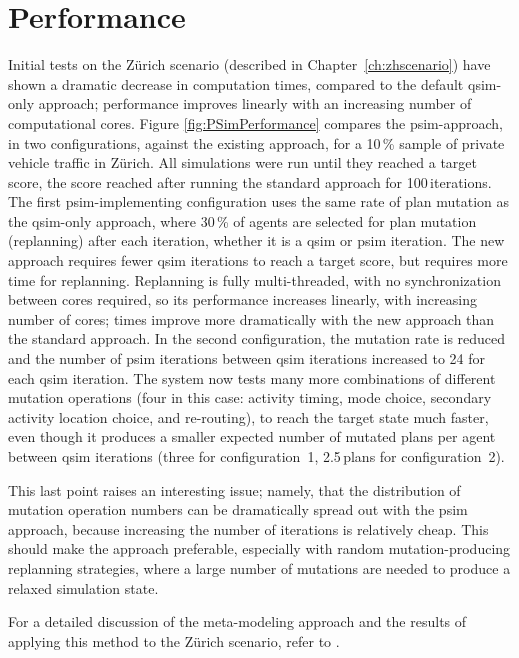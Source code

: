 \section{Performance}
Initial tests on the Zürich scenario (described in Chapter~\ref{ch:zhscenario}) have shown a dramatic decrease in computation times, compared to the default \gls{qsim}-only approach; performance improves linearly with an increasing number of computational cores.
Figure \ref{fig:PSimPerformance} compares the \gls{psim}-approach, in two configurations, against the existing approach, for a 10\,\% sample of private vehicle traffic in Zürich. All simulations were run until they reached a target score, \ie the score reached after running the standard approach for 100\,iterations. The first \gls{psim}-implementing configuration uses the same rate of plan mutation as the \gls{qsim}-only approach, where 30\,\% of agents are selected for plan mutation (replanning) after each iteration, whether it is a \gls{qsim} or \gls{psim} iteration. The new approach requires fewer \gls{qsim} iterations to reach a target score, but requires more time for replanning. Replanning is fully multi-threaded, with no synchronization between cores required, so its performance increases linearly, with increasing number of cores; times improve more dramatically with the new approach than the standard approach.
In the second configuration, the mutation rate is reduced and the number of \gls{psim} iterations between \gls{qsim} iterations increased to 24 for each \gls{qsim} iteration. The system now tests many more combinations of different mutation operations (four in this case: activity timing, mode choice, secondary activity location choice, and re-routing), to reach the target state much faster, even though it produces a smaller expected number of mutated plans per agent between \gls{qsim} iterations (three for configuration~1, 2.5\,plans for configuration~2).

This last point raises an interesting issue; namely, that the distribution of mutation operation numbers can be dramatically spread out with the \gls{psim} approach, because increasing the number of iterations is relatively cheap. This should make the approach preferable, especially with random mutation-producing replanning strategies, where a large number of mutations are needed to produce a relaxed simulation state.

For a detailed discussion of the meta-modeling approach and the results of applying this method to the Zürich scenario, refer to \citet[][]{FourieEtAl_TRR_2013}.

